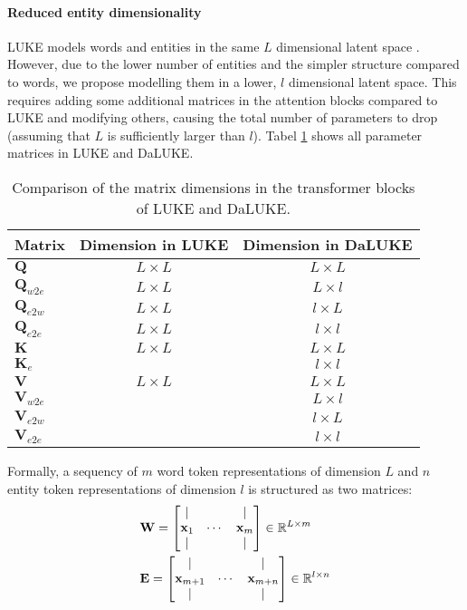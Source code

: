 \documentclass[10pt, a4paper]{article}
\begin{document}
\paragraph{Reduced entity dimensionality}
LUKE models words and entities in the same $ L $ dimensional latent space \cite{yamada2020luke}.
However, due to the lower number of entities and the simpler structure compared to words, we propose modelling them in a lower, $ l $ dimensional latent space.
This requires adding some additional matrices in the attention blocks compared to LUKE and modifying others, causing the total number of parameters to drop (assuming that $ L $ is sufficiently larger than $ l $).
Tabel \ref{tab:mats} shows all parameter matrices in LUKE and DaLUKE.
\begin{table}[H]
    \centering
    \footnotesize
    \begin{tabular}{l|c|c}
        Matrix&Dimension in LUKE&Dimension in DaLUKE\\\hline
        $ \mathbf Q $&$ L\times L $&$ L\times L $\\
        $ \mathbf Q_{w2e} $&$ L\times L $&$ L\times l $\\
        $ \mathbf Q_{e2w} $&$ L\times L $&$ l\times L $\\
        $ \mathbf Q_{e2e} $&$ L\times L $&$ l\times l $\\
        $ \mathbf K $&$ L\times L $&$ L\times L $\\
        $ \mathbf K_e $&&$ l\times l $\\
        $ \mathbf V $&$ L\times L $&$ L\times L $\\
        $ \mathbf V_{w2e} $&&$ L\times l $\\
        $ \mathbf V_{e2w} $&&$ l\times L $\\
        $ \mathbf V_{e2e} $&&$ l\times l $\\
    \end{tabular}
    \caption{Comparison of the matrix dimensions in the transformer blocks of LUKE and DaLUKE.}
    \label{tab:mats}
\end{table}\noindent
Formally, a sequency of $ m $ word token representations of dimension $ L $ and $ n $ entity token representations of dimension $ l $ is structured as two matrices:
\begin{align*}
    &\mathbf W = \begin{bmatrix}
        |&&|\\
        \mathbf x_1&\cdots&\mathbf x_m\\
        |&&|
    \end{bmatrix} \in \mathbb R^{L\times m}\\
    &\mathbf E = \begin{bmatrix}
        |&&|\\
        \mathbf x_{m+1}&\cdots&\mathbf x_{m+n}\\
        |&&|
    \end{bmatrix} \in \mathbb R^{l\times n}
\end{align*}
\end{document}
